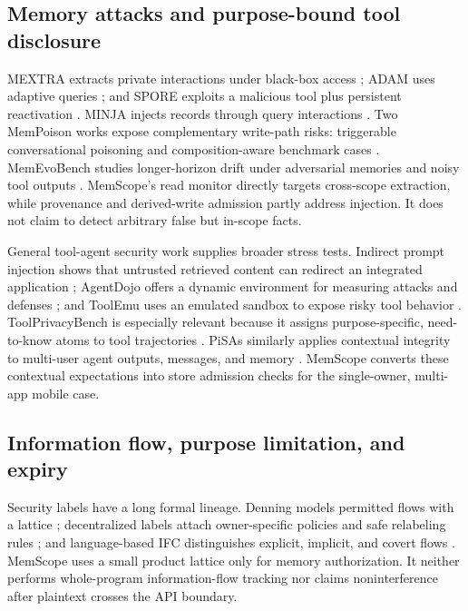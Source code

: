 \subsection{Memory attacks and purpose-bound tool disclosure}

MEXTRA extracts private interactions under black-box access \citep{wang2025mextra}; ADAM uses adaptive queries \citep{lyu2026adam}; and SPORE exploits a malicious tool plus persistent reactivation \citep{gao2026spore}. MINJA injects records through query interactions \citep{dong2025minja}. Two MemPoison works expose complementary write-path risks: triggerable conversational poisoning and composition-aware benchmark cases \citep{wang2026hijacking,gao2026mempoison}. MemEvoBench studies longer-horizon drift under adversarial memories and noisy tool outputs \citep{xie2026memevobench}. MemScope's read monitor directly targets cross-scope extraction, while provenance and derived-write admission partly address injection. It does not claim to detect arbitrary false but in-scope facts.

General tool-agent security work supplies broader stress tests. Indirect prompt injection shows that untrusted retrieved content can redirect an integrated application \citep{greshake2023indirect}; AgentDojo offers a dynamic environment for measuring attacks and defenses \citep{debenedetti2024agentdojo}; and ToolEmu uses an emulated sandbox to expose risky tool behavior \citep{ruan2023toolemu}. ToolPrivacyBench is especially relevant because it assigns purpose-specific, need-to-know atoms to tool trajectories \citep{hu2026toolprivacy}. PiSAs similarly applies contextual integrity to multi-user agent outputs, messages, and memory \citep{gupta2026pisas}. MemScope converts these contextual expectations into store admission checks for the single-owner, multi-app mobile case.

\subsection{Information flow, purpose limitation, and expiry}

Security labels have a long formal lineage. Denning models permitted flows with a lattice \citep{denning1976lattice}; decentralized labels attach owner-specific policies and safe relabeling rules \citep{myers1998decentralized,myers2000privacy}; and language-based IFC distinguishes explicit, implicit, and covert flows \citep{sabelfeld2003language}. MemScope uses a small product lattice only for memory authorization. It neither performs whole-program information-flow tracking nor claims noninterference after plaintext crosses the API boundary.

